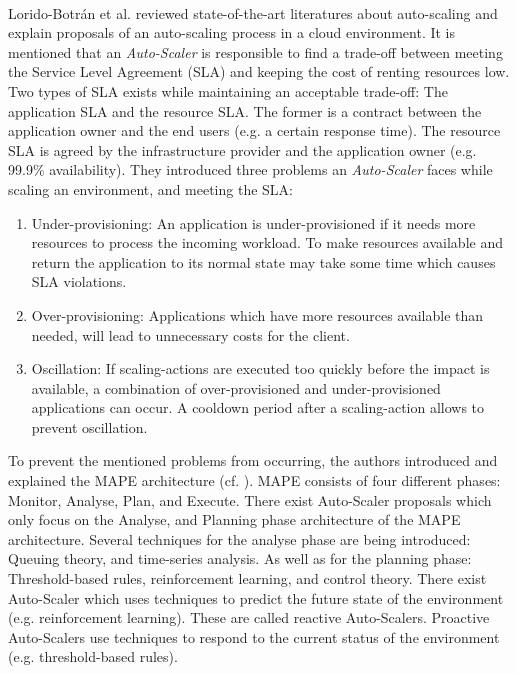 \paragraph{}
Lorido-Botrán et al. \cite{Lorido2014Review} reviewed state-of-the-art literatures about auto-scaling and explain proposals of an auto-scaling process in a cloud environment.
It is mentioned that an \textit{Auto-Scaler} is responsible to find a trade-off between meeting the Service Level Agreement (SLA) and keeping the cost of renting resources low.
Two types of SLA exists while maintaining an acceptable trade-off: The application SLA and the resource SLA. The former is a contract between the application owner and the end users (e.g. a certain response time). The resource SLA is agreed by the infrastructure provider and the application owner (e.g. 99.9\% availability).
They introduced three problems an \textit{Auto-Scaler} faces while scaling an environment, and meeting the SLA:
\begin{enumerate}
\item Under-provisioning:
An application is under-provisioned if it needs more resources to process the incoming workload.
To make resources available and return the application to its normal state may take some time which causes SLA violations.
\item Over-provisioning:
Applications which have more resources available than needed, will lead to unnecessary costs for the client.
\item Oscillation:
If scaling-actions are executed too quickly before the impact is available, a combination of over-provisioned and under-provisioned applications can occur.
A cooldown period after a scaling-action allows to prevent oscillation.
\end{enumerate}
To prevent the mentioned problems from occurring, the authors introduced and explained the MAPE architecture (cf. ).
MAPE consists of four different phases: Monitor, Analyse, Plan, and Execute.
There exist Auto-Scaler proposals which only focus on the Analyse, and Planning phase architecture of the MAPE architecture.
Several techniques for the analyse phase are being introduced: Queuing theory, and time-series analysis.
As well as for the planning phase: Threshold-based rules, reinforcement learning, and control theory.
There exist Auto-Scaler which uses techniques to predict the future state of the environment (e.g. reinforcement learning). These are called reactive Auto-Scalers.
Proactive Auto-Scalers use techniques to respond to the current status of the environment (e.g. threshold-based rules).


